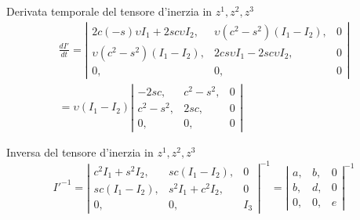 \documentclass[a4paper,11pt]{article}
\begin{document}
Derivata temporale del tensore d'inerzia in $ z^1, z^2, z^3 $
\begin{eqnarray}
	\frac{d I'}{dt}
	= \left|
	\begin{array}{lll}
	2 c (-s) \upsilon I_1+ 2 s c \upsilon I_2  ,	&	\upsilon (c^2-s^2) (I_1 - I_2),		&	0
	\\
	\upsilon (c^2-s^2) (I_1 - I_2),			&	2 c s \upsilon I_1- 2 s c \upsilon I_2,	&	0
	\\
	0,								&	0,							&	0
	\end{array}
	\right|
	\\
	= \upsilon (I_1 - I_2) \left|
	\begin{array}{lll}
	-2 s c  ,		&	c^2 - s ^2,	&	0
	\\
	c^2 - s ^2,	&	2 s c,			&	0
	\\
	0,			&	0,			&	0
	\end{array}
	\right|
\end{eqnarray}

Inversa del tensore d'inerzia in $ z^1, z^2, z^3 $
\[
	{I'}^{-1} = 
\left| 
\begin{array}{lll}
	c^2 I_1 + s^2 I_2,	&	sc (I_1 - I_2),		&	0
\\
	sc (I_1 - I_2),		&	s^2 I_1 + c^2 I_2,	&	0
\\
	0,				&	0,				&	I_3
\end{array}
\right|^{-1}
=
\left| 
\begin{array}{lll}
	a,	&	b,	&	0
\\
	b,	&	d,	&	0
\\
	0,	&	0,	&	e
\end{array}
\right|^{-1}
\]
\end{document}
